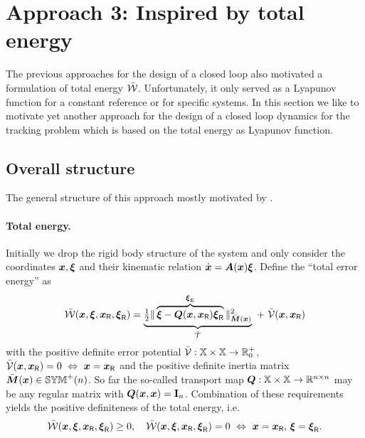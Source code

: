 \section{Approach 3: Inspired by total energy}\label{sec:CtrlApproachEnergy}
The previous approaches for the design of a closed loop also motivated a formulation of total energy $\totalEnergyC$.
Unfortunately, it only served as a Lyapunov function for a constant reference or for specific systems.
In this section we like to motivate yet another approach for the design of a closed loop dynamics for the tracking problem which is based on the total energy as Lyapunov function.

\subsection{Overall structure}
The general structure of this approach mostly motivated by \cite{Bullo:TrackingAutomatica}.

\paragraph*{Total energy.}
Initially we drop the rigid body structure of the system and only consider the coordinates $\sysCoord, \sysVel$ and their kinematic relation $\sysCoordd = \kinMat(\sysCoord) \sysVel$.
Define the ``total error energy'' as
\begin{align}\label{eq:DefTotalErrorEnergy}
 \totalEnergyC(\sysCoord, \sysVel, \sysCoordR, \sysVelR) = \underbrace{\tfrac{1}{2} \norm[\sysInertiaMatC(\sysCoord)]{\overbrace{\sysVel-\sysTransportMap(\sysCoord, \sysCoordR)\sysVelR}^{\sysVelE}}^2}_{\kineticEnergyC} \ + \ \potentialEnergyC(\sysCoord, \sysCoordR)
\end{align}
with the positive definite error potential $\potentialEnergyC: \configSpace \times \configSpace \rightarrow \RealNumSP$, $\potentialEnergyC(\sysCoord, \sysCoordR) = 0 \ \Leftrightarrow \ \sysCoord = \sysCoordR$ and the positive definite inertia matrix $\sysInertiaMatC(\sysCoord)\in\SymMatP(\dimConfigSpace)$.
So far the so-called transport map $\sysTransportMap: \configSpace \times \configSpace \rightarrow \RealNum^{\dimConfigSpace\times\dimConfigSpace}$ may be any regular matrix with $\sysTransportMap(\sysCoord, \sysCoord) = \idMat[\dimConfigSpace]$.
Combination of these requirements yields the positive definiteness of the total energy, i.e.
\begin{align}
 \totalEnergyC(\sysCoord, \sysVel, \sysCoordR, \sysVelR) \geq 0, \quad \totalEnergyC(\sysCoord, \sysVel, \sysCoordR, \sysVelR) = 0 \ \Leftrightarrow \ \sysCoord = \sysCoordR,\, \sysVel = \sysVelR.
\end{align}

